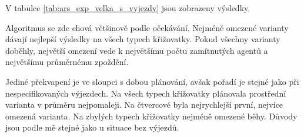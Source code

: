 V tabulce \ref{tab:ars_exp_velka_s_vyjezdy} jsou zobrazeny výsledky.

Algoritmus se zde chová většinově podle očekávání.
Nejméně omezené varianty dávají nejlepší výsledky na všech typech křižovatky.
Pokud všechny varianty doběhly, největší omezení vede k největšímu počtu zamítnutých agentů a
největšímu průměrnému zpoždění.

Jediné překvapení je ve sloupci s dobou plánování, avšak pořadí je stejné jako při nespecifikovaných výjezdech.
Na všech typech křižovatky plánovala prostřední varianta v průměru nejpomaleji.
Na čtvercové byla nejrychlejší první, nejvíce omezená varianta.
Na zbylých typech křižovatky nejméně omezené běhy.
Důvody jsou podle mě stejné jako u situace bez výjezdů.



